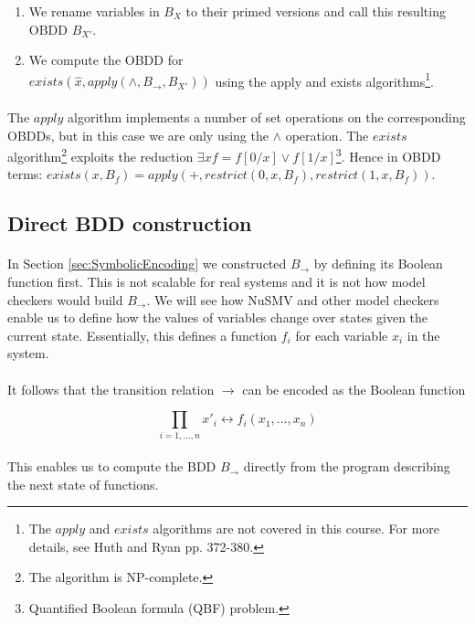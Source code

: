 \documentclass{article}
\theoremstyle{plain}
\theoremstyle{definition}
\begin{document}
\begin{multicols}{2}
\begin{enumerate}
\item We rename variables in $B_X$ to their primed versions and call this resulting OBDD $B_{X'}$.
\item We compute the OBDD for\\ $exists(\hat{x}, apply(\land, B_\rightarrow, B_{X'}))$ using the apply and exists algorithms\footnote{The $apply$ and $exists$ algorithms are not covered in this course. For more details, see Huth and Ryan pp. 372-380.}. 
\end{enumerate}

\paragraph{} The $apply$ algorithm implements a number of set operations on the corresponding OBDDs, but in this case we are only using the $\land$ operation. The $exists$ algorithm\footnote{The algorithm is NP-complete.} exploits the reduction $\exists x f = f[0/x] \lor f[1/x]$\footnote{Quantified Boolean formula (QBF) problem.}. Hence in OBDD terms: $exists(x, B_f) = apply(+, restrict(0, x, B_f), restrict(1, x, B_f))$.

\subsection{Direct BDD construction}

\paragraph{} In Section \ref{sec:SymbolicEncoding} we constructed $B_\rightarrow$ by defining its Boolean function first. This is not scalable for real systems and it is not how model checkers would build $B_\rightarrow$. We will see how NuSMV and other model checkers enable us to define how the values of variables change over states given the current state. Essentially, this defines a function $f_i$ for each variable $x_i$ in the system. 

\paragraph{} It follows that the transition relation $\rightarrow$ can be encoded as the Boolean function

$$\prod_{i = 1,...,n} x'_i \leftrightarrow f_i(x_1, ..., x_n)$$

\paragraph{} This enables us to compute the BDD $B_\rightarrow$ directly from the program describing the next state of functions.


\end{multicols}
\end{document}
